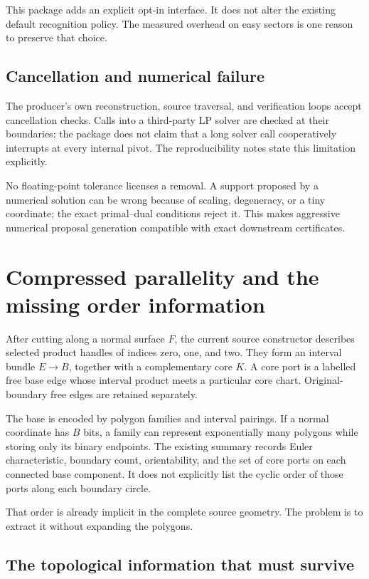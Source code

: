 \documentclass[11pt]{article}
\theoremstyle{definition}
\theoremstyle{remark}
\begin{document}
This package adds an explicit opt-in interface. It does not alter the
existing default recognition policy. The measured overhead on easy
sectors is one reason to preserve that choice.

\subsection{Cancellation and numerical failure}

The producer's own reconstruction, source traversal, and verification
loops accept cancellation checks. Calls into a third-party LP solver
are checked at their boundaries; the package does not claim that a
long solver call cooperatively interrupts at every internal pivot.
The reproducibility notes state this limitation explicitly.

No floating-point tolerance licenses a removal. A support proposed by a
numerical solution can be wrong because of scaling, degeneracy, or a tiny
coordinate; the exact primal--dual conditions reject it. This makes
aggressive numerical proposal generation compatible with exact
downstream certificates.

\section{Compressed parallelity and the missing order information}
\label{sec:geometry-interface}

After cutting along a normal surface \(F\), the current source constructor
describes selected product handles of indices zero, one, and two.
They form an interval bundle \(E\to B\), together with a complementary
core \(K\). A core port is a labelled free base edge whose interval product
meets a particular core chart. Original-boundary free edges are retained
separately.

The base is encoded by polygon families and interval pairings. If a
normal coordinate has \(B\) bits, a family can represent exponentially
many polygons while storing only its binary endpoints. The existing
summary records Euler characteristic, boundary count, orientability,
and the set of core ports on each connected base component. It does not
explicitly list the cyclic order of those ports along each boundary
circle.

That order is already implicit in the complete source geometry. The
problem is to extract it without expanding the polygons.

\subsection{The topological information that must survive}
\end{document}
